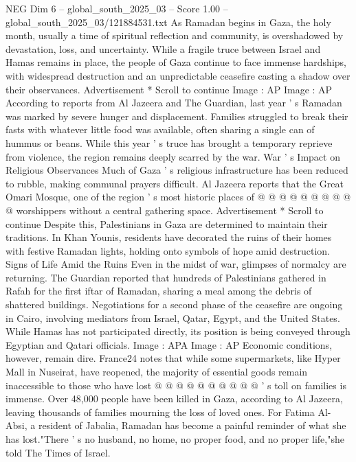 \begin{textsample}{NEG Dim 6 – global\_south\_2025\_03 – Score 1.00 – global\_south\_2025\_03/121884531.txt}  \label{ex:f6_neg_146}
As Ramadan begins in Gaza, the holy month, usually a time of spiritual reflection and community, is overshadowed by devastation, loss, and uncertainty.
While a fragile truce between Israel and Hamas remains in place, the people of Gaza continue to face immense hardships, with widespread destruction and an unpredictable ceasefire casting a shadow over their observances.
Advertisement * Scroll to continue Image : AP Image : AP According to reports from Al Jazeera and The Guardian, last year ' s Ramadan was marked by severe hunger and displacement.
Families struggled to break their fasts with whatever little food was available, often sharing a single can of hummus or beans.
While this year ' s truce has brought a temporary reprieve from violence, the region remains deeply scarred by the war.
War ' s Impact on Religious Observances Much of Gaza ' s religious infrastructure has been reduced to rubble, making communal prayers difficult.
Al Jazeera reports that the Great Omari Mosque, one of the region ' s most historic places of @ @ @ @ @ @ @ @ @ @ worshippers without a central gathering space.
Advertisement * Scroll to continue Despite this, Palestinians in Gaza are determined to maintain their traditions.
In Khan Younis, residents have decorated the ruins of their homes with festive Ramadan lights, holding onto symbols of hope amid destruction.
Signs of Life Amid the Ruins Even in the midst of war, glimpses of normalcy are returning.
The Guardian reported that hundreds of Palestinians gathered in Rafah for the first iftar of Ramadan, sharing a meal among the debris of shattered buildings.
Negotiations for a second phase of the ceasefire are ongoing in Cairo, involving mediators from Israel, Qatar, Egypt, and the United States.
While Hamas has not participated directly, its position is being conveyed through Egyptian and Qatari officials.
Image : APA Image : AP Economic conditions, however, remain dire.
France24 notes that while some supermarkets, like Hyper Mall in Nuseirat, have reopened, the majority of essential goods remain inaccessible to those who have lost @ @ @ @ @ @ @ @ @ @ ' s toll on families is immense.
Over 48,000 people have been killed in Gaza, according to Al Jazeera, leaving thousands of families mourning the loss of loved ones.
For Fatima Al-Absi, a resident of Jabalia, Ramadan has become a painful reminder of what she has lost."There ' s no husband, no home, no proper food, and no proper life,"she told The Times of Israel.

\end{textsample}
